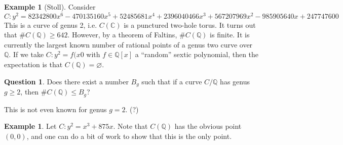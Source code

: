 \documentclass{article}
\theoremstyle{definition}
\newtheorem{example}[subsection]{Example}
\newtheorem{question}[subsection]{Question}
\begin{document}
\begin{example}[Stoll]
Consider 
\[
  C : y^2=82342800 x^6 - 470135160 x^5 + 52485681 x^4 + 2396040466 x^3 + 567207969 x^2 - 985905640 x + 247747600
\]
This is a curve of genus 2, i.e. $C(\mathbb{C})$ is a punctured two-hole 
torus. It turns out that $\# C(\mathbb{Q})\geqslant 642$. However, by a 
theorem of Faltins, $\# C(\mathbb{Q})$ is finite. It is currently the 
largest known number of rational points of a genus two curve over 
$\mathbb{Q}$. If we take $C:y^2=f(x0$ with $f\in\mathbb{Q}[x]$ a ``random'' 
sextic polynomial, then the expectation is that $C(\mathbb{Q})=\varnothing$. 
\end{example}

\begin{question}
Does there exist a number $B_g$ such that if a curve $C/\mathbb{Q}$ has 
genus $g\geqslant 2$, then $\# C(\mathbb{Q})\leqslant B_g$?
\end{question}

This is not even known for genus $g=2$. (?)

\begin{example}
Let $C:y^2=x^3+875 x$. Note that $C(\mathbb{Q})$ has the obvious point 
$(0,0)$, and one can do a bit of work to show that this is the only point. 
\end{example}
\end{document}
